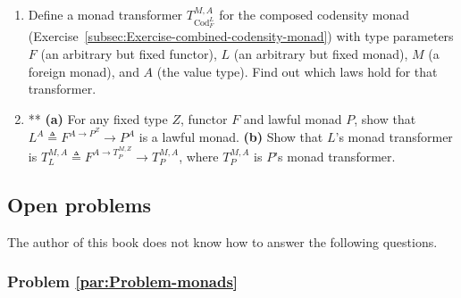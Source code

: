 \begin{enumerate}
\[\begin{array}{c}
a_{1}\end{array}\right|\quad,\quad\quad t_{2}=\left|\begin{array}{cc}
a_{1}\\
a_{2} & a_{3}
\end{array}\right|\quad,\quad\quad t_{3}=\left|\begin{array}{cccc}
a_{1}\\
a_{2} & a_{3}\\
a_{4} & a_{5} & a_{6}\\
a_{7} & a_{8} & a_{9} & a_{10}
\end{array}\right|\quad.
\]
Unlike \lstinline!List[List[A]]!, it should \emph{not} be possible
to have a value of type \lstinline!Triang[A]! that has an unexpected
shape:
\[
t=\left|\begin{array}{cccc}
a_{1}\\
a_{2} & a_{3}\\
a_{7} & a_{8} & a_{9} & a_{10}
\end{array}\right|\quad\text{is not of type }\text{Triang}^{A}\quad.
\]
 Implement \lstinline!Functor!, \lstinline!Applicative!, and \lstinline!Traversable!
instances for \lstinline!Triang!.
\item Define a monad transformer $T_{\text{Cod}_{F}^{L}}^{M,A}$ for the
composed codensity monad (Exercise~\ref{subsec:Exercise-combined-codensity-monad})
with type parameters $F$ (an arbitrary but fixed functor), $L$ (an
arbitrary but fixed monad), $M$ (a foreign monad), and $A$ (the
value type). Find out which laws hold for that transformer.
\item {*}{*} \textbf{(a)} For any fixed type $Z$, functor $F$ and lawful
monad $P$, show that $L^{A}\triangleq F^{A\rightarrow P^{Z}}\rightarrow P^{A}$
is a lawful monad. \textbf{(b)} Show that $L$\textsf{'}s monad transformer
is $T_{L}^{M,A}\triangleq F^{A\rightarrow T_{P}^{M,Z}}\rightarrow T_{P}^{M,A}$,
where $T_{P}^{M,A}$ is $P$\textsf{'}s monad transformer.
\end{enumerate}

\subsection{Open problems}

The author of this book does not know how to answer the following
questions.

\subsubsection{Problem \label{par:Problem-monads}\ref{par:Problem-monads}}

